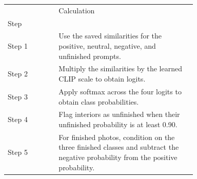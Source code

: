 \begin{tabular}{lp{0.73\linewidth}}
\toprule
 & Calculation \\
Step &  \\
\midrule
Step 1 & Use the saved similarities for the positive, neutral, negative, and unfinished prompts. \\
Step 2 & Multiply the similarities by the learned CLIP scale to obtain logits. \\
Step 3 & Apply softmax across the four logits to obtain class probabilities. \\
Step 4 & Flag interiors as unfinished when their unfinished probability is at least 0.90. \\
Step 5 & For finished photos, condition on the three finished classes and subtract the negative probability from the positive probability. \\
\bottomrule
\end{tabular}
